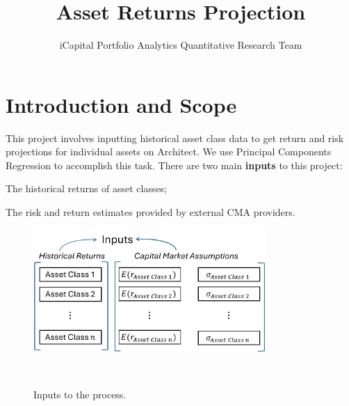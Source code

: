 \documentclass{ledger}
\title{Asset Returns Projection}
\author{iCapital Portfolio Analytics Quantitative Research Team}
\begin{document}
\maketitle

\thispagestyle{pagefirst}



\section{Introduction and Scope}
This project involves inputting historical asset class data to get return and risk projections for individual assets on Architect. We use Principal Components Regression to accomplish this task. There are two main \textbf{inputs} to this project:
\begin{compactenum}
	\item The historical returns of asset classes;
	\item The risk and return estimates provided by external CMA providers. \\
\end{compactenum}

\begin{figure}[!ht]
\centering
	\includegraphics[width=250pt]{Inputs.pdf}
	 \caption{Inputs to the process.} ~\\
\end{figure}
\end{document}
